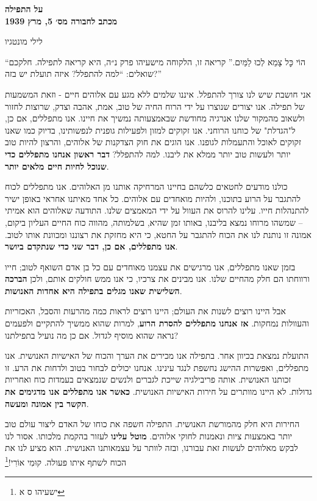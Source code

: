 \documentclass[12pt, extrafontsizes, twopage, a5paper]{memoir}
\begin{document}
{
  \centering\LARGE\bfseries על התפילה\\
  \large מכתב לחבורה מס׳ 5, מרץ 1939

  \Large לילי מונטגיו


}

``הוֹי כׇּל צָמֵא לְכוּ לַמַּיִם.''
קריאה זו, הלקוחה מישעיהו פרק נ״ה, היא קריאה לתפילה. חלקכם שואלים: ``למה להתפלל? איזה תועלת יש בזה?''

אני חושבת שיש לנו צורך להתפלל. איננו שלמים ללא מגע עם אלוהים חיים - וזאת המשמעות של תפילה. אנו יצורים שנוצרו על ידי הרוח החיה של טוב, אמת, אהבה וצדק, שרוצות לחזור ולשאוב מהמקור שלנו אנרגיה מחודשת שבאמצעותה נמשיך את חיינו. אנו מתפללים, אם כן, ל"הגדלת" של כוחנו הרוחני. אנו זקוקים למזון ולפעילות גופנית לנפשותינו, בדיוק כמו שאנו זקוקים לאוכל והתעמלות לגופנו. אנו הוגים את חוק הצדקנות של אלוהים, והרצון להיות טוב יותר ולעשות טוב יותר ממלא את ליבנו. למה להתפלל? \textbf{דבר ראשון אנחנו מתפללים כדי שנוכל לחיות חיים מלאים יותר}.

כולנו מודעים לחטאים כלשהם בחיינו המרחיקה אותנו מן האלוהים. אנו מתפללים לכוח להתגבר על הרוע בתוכנו, ולהיות מואחדים עם אלוהים. כל אחד מאיתנו אחראי באופן ישיר להתנהלות חייו. עלינו להרוס את העוול על ידי המאמצים שלנו. התודעה שאלוהים הוא אמיתי -- שמשהו מרוחו נמצא בליבנו, באותו זמן שהיא, בשלמותה, מהווה כוח החיים העליון ביקום, אמונה זו נותנת לנו את הכוח להתגבר על החטא, כי היא מחזקת את רצוננו ומכוונת אותו לטוב. \textbf{אנו מתפללים, אם כן, דבר שני כדי שנתקדם ביושר}.

בזמן שאנו מתפללים, אנו מרגישים את עצמנו מאוחדים עם כל בן אדם השואף לטוב; חייו ורווחתו הם חלק מהחיים שלנו. אנו מבינים את צרכיו, כי אנו ממש חולקים אותם, ולכן \textbf{הברכה השלישית שאנו מגלים בתפילה היא אחדות האנושות}.

אבל היינו רוצים לשנות את העולם; היינו רוצים לראות כמה מהרעות והסבל, האכזריות והעוולות נמחקות. \textbf{אז אנחנו מתפללים להסרת הרוע}, למרות שהוא ממשיך להתקיים ולפעמים נראה שהוא מוסיף לגדול. אם כן מה נועיל בתפילתנו?

התועלת נמצאת בכיוון אחר. בתפילה אנו מכירים את הערך והכוח של האישיות האנושית. אנו מתפללים, ואפשרות ההישג נחשפת לנגד עינינו. אנחנו יכולים לבחור בטוב ולדחות את הרע. זו זכותנו האנושית. אותה פריבילגיה שייכת לגברים ולנשים שנמצאים בעמדות כוח ואחריות גדולות. לא היינו מוותרים על חירות האישיות האנושית. \textbf{כאשר אנו מתפללים אנו מדגימים את הקשר בין אמונה ומעשה}.

החירות היא חלק מהמורשת האנושית. התפילה חשפה את כוחו של האדם ליצור עולם טוב יותר באמצעות ציות ונאמנות לחוקי אלוהים. \textbf{מוטל עלינו} לעזור בהקמת מלכותו. אסור לנו לבקש מאלוהים לעשות זאת עבורנו, ובזה לוותר על עצמאותנו האנושית. הוא מציע לנו את הכוח לשתף איתו פעולה. קוּמִי אוֹרִי!\footnote{ישעיהו ס א}
\end{document}
